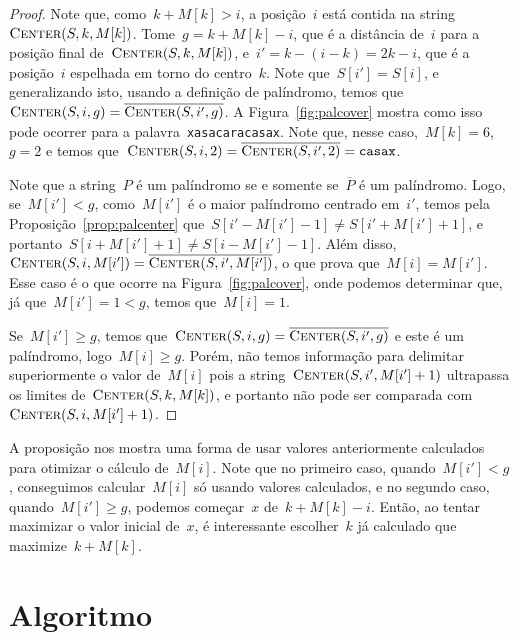 \begin{proof}
Note que, como~${k + M[k] > i}$, a posição~$i$ está contida na string~$\textsc{Center}(S, k, M[k])$. Tome~${g = k + M[k] - i}$, que é a distância de~$i$ para a posição final de~$\textsc{Center}(S, k, M[k])$, e~${i' = k-(i-k)= 2k-i}$, que é a posição~$i$ espelhada em torno do centro~$k$. Note que~${S[i'] = S[i]}$, e generalizando isto, usando a definição de palíndromo, temos que~$\textsc{Center}(S, i, g) = \overline{\textsc{Center}(S, i', g)}$. A Figura~\ref{fig:palcover} mostra como isso pode ocorrer para a palavra~\texttt{xasacaracasax}. Note que, nesse caso,~${M[k] = 6}$,~${g = 2}$ e temos que~${\textsc{Center}(S, i, 2) = \overline{\textsc{Center}(S, i', 2)} = \texttt{casax}}$.

Note que a string~$P$ é um palíndromo se e somente se~$\overline{P}$ é um palíndromo.
Logo, se~${M[i'] < g}$, como~$M[i']$ é o maior palíndromo centrado em~$i'$, temos pela Proposição~\ref{prop:palcenter} que~${S[i'-M[i']-1] \neq S[i'+M[i']+1]}$, e portanto~${S[i +M[i']+1] \neq S[i-M[i']-1]}$. Além disso,~${\textsc{Center}(S, i, M[i']) = \overline{\textsc{Center}(S, i', M[i'])}}$, o que prova que~${M[i] = M[i']}$. Esse caso é o que ocorre na Figura~\ref{fig:palcover}, onde podemos determinar que, já que~${M[i'] = 1 < g}$, temos que~${M[i] = 1}$.

Se~$M[i'] \geq g$, temos que~${\textsc{Center}(S, i, g) = \overline{\textsc{Center}(S, i', g)}}$ e este é um palíndromo, logo~${M[i] \geq g}$. Porém, não temos informação para delimitar superiormente o valor de~$M[i]$ pois a string~$\textsc{Center}(S, i', M[i']+1)$ ultrapassa os limites de~$\textsc{Center}(S, k, M[k])$, e portanto não pode ser comparada com~$\textsc{Center}(S, i, M[i']+1)$.
\end{proof}

A proposição nos mostra uma forma de usar valores anteriormente calculados para otimizar o cálculo de~$M[i]$. Note que no primeiro caso, quando~${M[i'] < g}$, conseguimos calcular~$M[i]$ só usando valores calculados, e no segundo caso, quando~${M[i'] \geq g}$, podemos começar~$x$ de~${k + M[k] - i}$. Então, ao tentar maximizar o valor inicial de~$x$, é interessante escolher~$k$ já calculado que maximize~${k + M[k]}$.

\section{Algoritmo}

